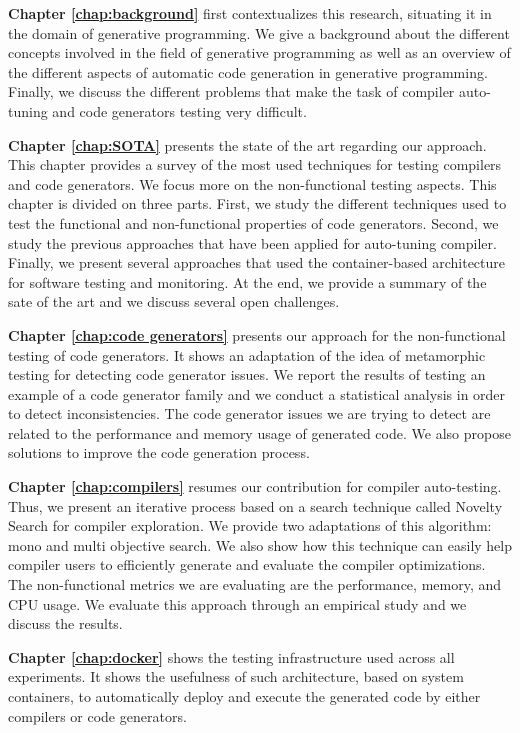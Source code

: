 \textbf{Chapter \ref{chap:background}} first contextualizes this research, situating it in the domain of generative programming. We give a background about the different concepts involved in the field of generative programming as well as an overview of the different aspects of automatic code generation in generative programming. Finally, we discuss the different problems that make the task of compiler auto-tuning and code generators testing very difficult.

\textbf{Chapter \ref{chap:SOTA}} presents the state of the art regarding our approach. This chapter provides a survey of the most used techniques for testing compilers and code generators. We focus more on the non-functional testing aspects.
This chapter is divided on three parts. First, we study the different techniques used to test the functional and non-functional properties of code generators. Second, we study the previous approaches that have been applied for auto-tuning compiler. Finally, we present several approaches that used the container-based architecture for software testing and monitoring. At the end, we provide a summary of the sate of the art and we discuss several open challenges.

\textbf{Chapter \ref{chap:code generators}} presents our approach for the non-functional testing of code generators. It shows an adaptation of the idea of metamorphic testing for detecting code generator issues. We report the results of testing an example of a code generator family and we conduct a statistical analysis in order to detect inconsistencies. The code generator issues we are trying to detect are related to the performance and memory usage of generated code. We also  propose solutions to improve the code generation process.

\textbf{Chapter \ref{chap:compilers}} resumes our contribution for compiler auto-testing. Thus, we present an iterative process based on a search technique called Novelty Search for compiler  exploration. We provide two adaptations of this algorithm: mono and multi objective search. We also show how this technique can easily help compiler users to efficiently generate and evaluate the compiler optimizations. The non-functional metrics we are evaluating are the performance, memory, and CPU usage. We evaluate this approach through an empirical study and we discuss the results.

\textbf{Chapter \ref{chap:docker}} shows the testing infrastructure used across all experiments. It shows the usefulness of such architecture, based on system containers, to automatically deploy and execute the generated code by either compilers or code generators. 

